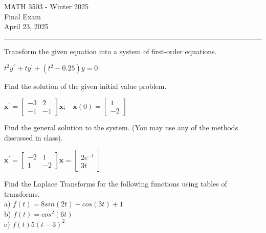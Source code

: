 \documentclass[12pt,letterpaper, onecolumn]{exam}
\begin{document}
\begingroup  
    \centering
    \LARGE MATH 3503 - Winter 2025\\
    \LARGE Final Exam\\[0.5em]
    \large April 23, 2025\\[0.5em]
\endgroup
\rule{\textwidth}{0.4pt}
\pointsdroppedatright   %
\printanswers
\renewcommand{\solutiontitle}{\noindent\textbf{Ans:}\enspace}   %

\begin{questions}
    
\thispagestyle{empty}   %
    
    \question[1 Marks] Transform the given equation into a system of first-order equations.\\
              \begin{center} $t^2 y^{''} + t y^{'} + (t^2 - 0.25)y = 0$ \end{center} 
    \droppoints

    \question[2 Marks] Find the solution of the given initial value problem. \\
              \begin{center} $\mathbf{x}^{'} = \begin{bmatrix} -3 & 2 \\ -1 & -1 \end{bmatrix} \mathbf{x}; \; \; \; \mathbf{x}(0) = \begin{bmatrix} 1 \\ -2 \end{bmatrix}$ \end{center}
    \droppoints
    
    \question[2 Marks] Find the general solution to the system. (You may use any of the methods discussed in class). \\
              \begin{center} $\mathbf{x}^{'} = \begin{bmatrix} -2 & 1 \\ 1 & -2 \end{bmatrix} \mathbf{x} = \begin{bmatrix} 2 e^{-t} \\ 3 t \end{bmatrix}$ \end{center}
    \droppoints
    
    \question[3 Marks] Find the Laplace Transforms for the following functions using tables of transforms. \\
             a) $f(t) = 8 sin(2t) - cos(3t) + 1$ \\
             b) $f(t) = cos^2 (6t)$ \\
             c) $f(t) 5(t - 3)^2$
    \droppoints


\end{questions}
\end{document}
